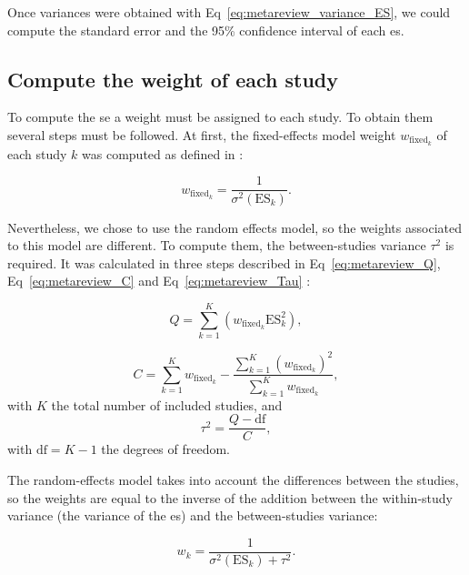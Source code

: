 \documentclass[12pt,a4paper,english]{article}
\begin{document}
Once variances were obtained with Eq~\ref{eq:metareview_variance_ES}, we could compute the standard error and the 95\% confidence interval of each \gls{es}. 

\subsection{Compute the weight of each study}

To compute the \gls{se} a weight must be assigned to each study. To obtain them several steps must be followed. At first, the fixed-effects model 
weight $w_{\text{fixed}_k}$ of each study $k$ was computed as defined in \citet{Borenstein2009}: 

\begin{equation}
\label{eq:metareview_weight_fixed_study}
w_{\text{fixed}_k} = \frac{1}{\sigma^2(\text{ES}_k)}.
\end{equation} 

\noindent Nevertheless, we chose to use the random effects model, so the weights associated to this model are different. 
To compute them, the between-studies variance $\tau^2$ is required. It was calculated in three steps described 
in Eq~\ref{eq:metareview_Q}, Eq~\ref{eq:metareview_C} and Eq~\ref{eq:metareview_Tau} 
\citep{Borenstein2009}:

\begin{equation}
\label{eq:metareview_Q}
Q = \sum_{k=1}^{K} (w_{\text{fixed}_k} \text{ES}_k^2),
\end{equation}

\begin{equation}
\label{eq:metareview_C}
C = \sum_{k=1}^{K} w_{\text{fixed}_k} - \frac{ \sum_{k=1}^{K} (w_{\text{fixed}_k})^2 } { \sum_{k=1}^{K} w_{\text{fixed}_k} },
\end{equation}
\noindent with $K$ the total number of included studies, and
\begin{equation}
\label{eq:metareview_Tau}
\tau^2 = \frac{Q - \text{df}}{C},
\end{equation}
\noindent with $\text{df} = K - 1$ the degrees of freedom.

\noindent The random-effects model takes into account the differences between the studies, so the weights are equal to the inverse of the addition between the 
within-study variance (the variance of the \gls{es}) and the between-studies variance:

\begin{equation}
\label{eq:metareview_weight_study}
w_k = \frac{1}{\sigma^2(\text{ES}_k) + \tau^2}.
\end{equation} 
\end{document}
